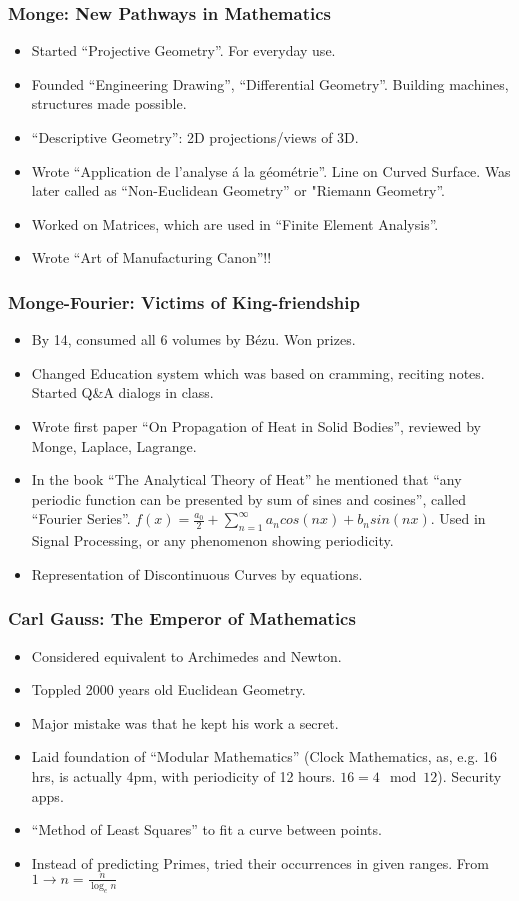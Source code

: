 \begin{frame}[fragile]
\frametitle{Monge: New Pathways in Mathematics}
\begin{itemize}
\item Started ``Projective Geometry''. For everyday use.
\item Founded ``Engineering Drawing'', ``Differential Geometry''.  Building machines, structures made possible.
\item ``Descriptive Geometry'': 2D projections/views of 3D.
\item Wrote ``Application de l'analyse \'a la g\'eom\'etrie''. Line on Curved Surface. Was later called as ``Non-Euclidean Geometry'' or "Riemann Geometry''.
\item Worked on Matrices, which are used in ``Finite Element Analysis''.
\item Wrote ``Art of Manufacturing Canon''!! 
\end{itemize}
\end{frame}

\begin{frame}[fragile]
\frametitle{Monge-Fourier: Victims of King-friendship}
\begin{itemize}
\item By 14, consumed all 6 volumes by B\'ezu. Won prizes.
\item Changed Education system which was based on cramming, reciting notes. Started Q\&A dialogs in class.
\item Wrote first paper ``On Propagation of Heat in Solid Bodies'', reviewed by Monge, Laplace, Lagrange.
\item In the book ``The Analytical Theory of Heat'' he mentioned that ``any periodic function can be presented by sum of sines and cosines'', called ``Fourier Series''. $ f(x) = \frac{a_0}{2} + \sum \limits^{\infty}_{n=1} a_n cos(nx) + b_n sin(nx)$. Used in Signal Processing, or any phenomenon showing periodicity.
\item Representation of Discontinuous Curves by equations.
\end{itemize}
\end{frame}

\begin{frame}[fragile]
\frametitle{Carl Gauss: The Emperor of Mathematics}
\begin{itemize}
\item Considered equivalent to Archimedes and Newton.
\item Toppled 2000 years old Euclidean Geometry.
\item Major mistake was that he kept his work a secret.
\item Laid foundation of ``Modular Mathematics'' (Clock Mathematics, as, e.g. 16 hrs, is actually 4pm, with periodicity of 12 hours. $ 16 = 4 \mod 12$). Security apps.
\item ``Method of Least Squares'' to fit a curve between points.
\item Instead of predicting Primes, tried their occurrences in given ranges. From $1 \rightarrow n = \frac{n}{\log_e{n}}$
\end{itemize}
\end{frame}

